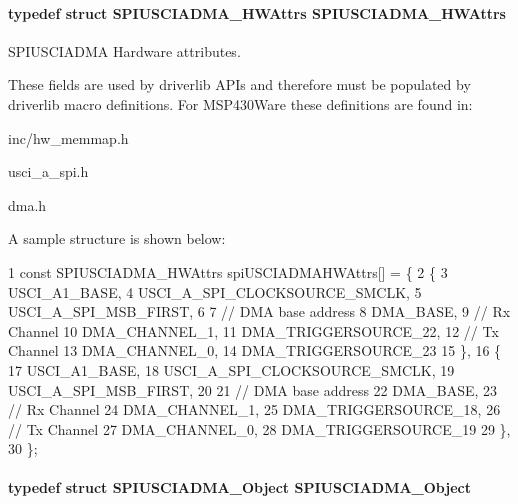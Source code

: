 \paragraph[{S\+P\+I\+U\+S\+C\+I\+A\+D\+M\+A\+\_\+\+H\+W\+Attrs}]{\setlength{\rightskip}{0pt plus 5cm}typedef struct {\bf S\+P\+I\+U\+S\+C\+I\+A\+D\+M\+A\+\_\+\+H\+W\+Attrs}  {\bf S\+P\+I\+U\+S\+C\+I\+A\+D\+M\+A\+\_\+\+H\+W\+Attrs}}\label{_s_p_i_u_s_c_i_a_d_m_a_8h_a36eab8cb3bdf2310f5ab1f66a0e12e7a}


S\+P\+I\+U\+S\+C\+I\+A\+D\+M\+A Hardware attributes. 

These fields are used by driverlib A\+P\+Is and therefore must be populated by driverlib macro definitions. For M\+S\+P430\+Ware these definitions are found in\+:
\begin{DoxyItemize}
\item inc/hw\+\_\+memmap.\+h
\item usci\+\_\+a\+\_\+spi.\+h
\item dma.\+h
\end{DoxyItemize}

A sample structure is shown below\+: 
\begin{DoxyCode}
1 const SPIUSCIADMA\_HWAttrs spiUSCIADMAHWAttrs[] = \{
2     \{
3         USCI\_A1\_BASE,
4         USCI\_A\_SPI\_CLOCKSOURCE\_SMCLK,
5         USCI\_A\_SPI\_MSB\_FIRST,
6 
7         // DMA base address
8         DMA\_BASE,
9         // Rx Channel
10         DMA\_CHANNEL\_1,
11         DMA\_TRIGGERSOURCE\_22,
12         // Tx Channel
13         DMA\_CHANNEL\_0,
14         DMA\_TRIGGERSOURCE\_23
15     \},
16     \{
17         USCI\_A1\_BASE,
18         USCI\_A\_SPI\_CLOCKSOURCE\_SMCLK,
19         USCI\_A\_SPI\_MSB\_FIRST,
20 
21         // DMA base address
22         DMA\_BASE,
23         // Rx Channel
24         DMA\_CHANNEL\_1,
25         DMA\_TRIGGERSOURCE\_18,
26         // Tx Channel
27         DMA\_CHANNEL\_0,
28         DMA\_TRIGGERSOURCE\_19
29     \},
30 \};
\end{DoxyCode}
\paragraph[{S\+P\+I\+U\+S\+C\+I\+A\+D\+M\+A\+\_\+\+Object}]{\setlength{\rightskip}{0pt plus 5cm}typedef struct {\bf S\+P\+I\+U\+S\+C\+I\+A\+D\+M\+A\+\_\+\+Object}  {\bf S\+P\+I\+U\+S\+C\+I\+A\+D\+M\+A\+\_\+\+Object}}\label{_s_p_i_u_s_c_i_a_d_m_a_8h_add524b2585b8b4aaaede70d3f0356c9d}


